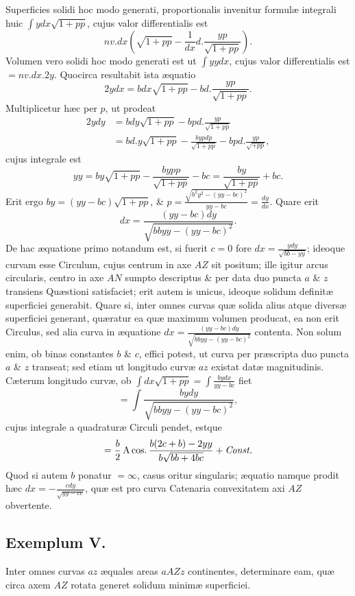 Superficies solidi hoc modo generati, proportionalis invenitur formulæ integrali huic $\int ydx\sqrt{1+pp}$, cujus valor differentialis est
\[
nv.dx\left(\sqrt{1+pp}-\frac1{dx}d.\frac{yp}{\sqrt{1+pp}}\right).
\]
Volumen vero solidi hoc modo generati est ut $\int yydx$, cujus valor differentialis est $=nv.dx.2y$. Quocirca resultabit ista æquatio
\[2ydx=bdx\sqrt{1+pp}-bd.\frac{yp}{\sqrt{1+pp}}.\]
Multiplicetur hæc per $p$, ut prodeat
\[
\begin{aligned}
2ydy&=bdy\sqrt{1+pp}-bpd.\frac{yp}{\sqrt{1+pp}}\\
&=bd.y\sqrt{1+pp}-\frac{bypdp}{\sqrt{1+pp}}-bpd.\frac{yp}{\sqrt{+pp}},
\end{aligned}
\]
cujus integrale est
\[yy=by\sqrt{1+pp}-\frac{bypp}{\sqrt{1+pp}}-bc=\frac{by}{\sqrt{1+pp}}+bc.\]
Erit ergo $by=(yy-bc)\sqrt{1+pp}$, \& $p=\frac{\sqrt{b^2y^2-(yy-bc)^2}}{yy-bc}=\frac{dy}{dx}$. Quare erit
\[dx=\frac{(yy-bc)dy}{\sqrt{bbyy-(yy-bc)^2}}.\]
De hac æquatione primo notandum est, si fuerit $c=0$ fore $dx=\frac{ydy}{\sqrt{bb-yy}}$; ideoque curvam esse Circulum, cujus centrum in axe $AZ$ sit positum; ille igitur arcus circularis, centro in axe $AN$ sumpto descriptus \& per data duo puncta $a$ \& $z$ transiens Quæstioni satisfaciet; erit autem is unicus, ideoque solidum definitæ superficiei generabit. Quare si, inter omnes curvas quæ solida alius atque diversæ superficiei generant, quæratur ea quæ maximum volumen producat, ea non erit Circulus, sed alia curva in æquatione $dx=\frac{(yy-bc)dy}{\sqrt{bbyy-(yy-bc)^2}}$ contenta. Non solum enim, ob binas constantes $b$ \& $c$, effici potest, ut curva per præscripta duo puncta $a$ \& $z$ transeat; sed etiam ut longitudo curvæ $az$ existat datæ magnitudinis. Cæterum longitudo curvæ, ob $\int dx\sqrt{1+pp}=\int\frac{bydx}{yy-bc}$ fiet
\[
=\int\frac{bydy}{\sqrt{bbyy-(yy-bc)^2}},
\]
cujus integrale a quadraturæ Circuli pendet, estque
\[
=\frac b2\operatorname{A\,cos\textnormal{.}}\frac{b(2c+b)-2yy}{b\sqrt{bb+4bc}}+\textit{Const.}
\]
Quod si autem $b$ ponatur $=\infty$, casus oritur singularis; æquatio namque prodit hæc $dx=-\frac{cdy}{\sqrt{yy-cc}}$, quæ est pro curva Catenaria convexitatem axi $AZ$ obvertente.

\subsection*{Exemplum V.}
Inter omnes curvas $az$ æquales areas $aAZz$ continentes, determinare eam, quæ circa axem $AZ$ rotata generet solidum minimæ superficiei.

